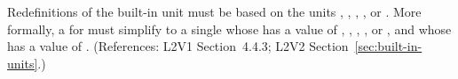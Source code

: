 Redefinitions of the built-in unit  must be based on the
units , , , , or
.  More formally, a \UnitDefinition for
 must simplify to a single \Unit whose  
has a value of , , , , or
, and whose   has a value of
.  (References: L2V1 Section~4.4.3; L2V2
Section~\ref{sec:built-in-units}.)
